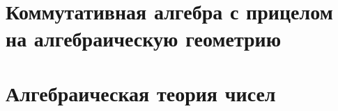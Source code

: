 \documentclass[dvipsnames, 11pt]{article}
\begin{document}
    
    \tableofcontents


    \section{Коммутативная алгебра с прицелом на алгебраическую геометрию}


    
    
    
    
    
    
    



    \newpage

    \section{Алгебраическая теория чисел}
\end{document}
